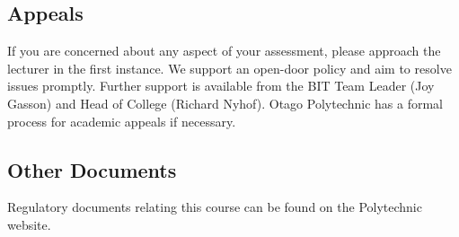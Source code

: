 \documentclass{article}
\begin{document}
\subsection*{Appeals}
If you are concerned about any aspect of your assessment, please approach the lecturer in the first instance. We support an open-door policy and aim to resolve issues promptly. Further support is available from the BIT Team Leader (Joy Gasson) and Head of College (Richard Nyhof). Otago Polytechnic has a formal process for academic appeals if necessary.

\subsection*{Other Documents}
Regulatory documents relating this course can be found on the Polytechnic website.
\end{document}
